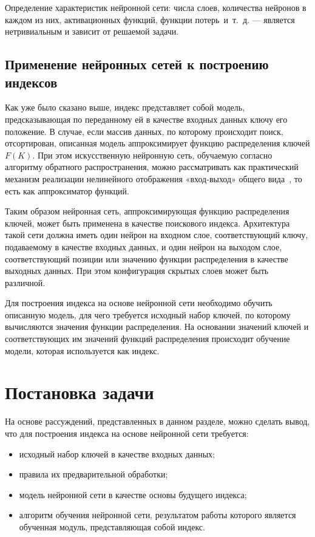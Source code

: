 Определение характеристик нейронной сети: числа слоев, количества нейронов в
каждом из них, активационных функций, функции потерь~и~т.~д. --- является
нетривиальным и зависит от решаемой задачи.

\subsection{Применение нейронных сетей к построению индексов}

Как уже было сказано выше, индекс представляет собой модель, предсказывающая по
переданному ей в качестве входных данных ключу его положение. В случае, если
массив данных, по которому происходит поиск, отсортирован, описанная модель
аппроксимирует функцию распределения ключей $F(K)$. При этом искусственную
нейронную сеть, обучаемую согласно алгоритму обратного распространения, можно
рассматривать как практический механизм реализации нелинейного отображения
«вход-выход» общего вида~\cite{kalistratov}, то есть как аппроксиматор функций.

Таким образом нейронная сеть, аппроксимирующая функцию распределения ключей,
может быть применена в качестве поискового индекса. Архитектура такой сети
должна иметь один нейрон на входном слое, соответствующий ключу, подаваемому в
качестве входных данных, и один нейрон на выходом слое, соответствующий позиции
или значению функции распределения в качестве выходных данных. При этом
конфигурация скрытых слоев может быть различной.


Для построения индекса на основе нейронной сети необходимо обучить описанную
модель, для чего требуется исходный набор ключей, по которому вычисляются
значения функции распределения. На основании значений ключей и соответствующих
им значений функций распределения происходит обучение модели, которая
используется как индекс.

\section{Постановка задачи}

На основе рассуждений, представленных в данном разделе, можно сделать вывод, что
для построения индекса на основе нейронной сети требуется:

\begin{itemize}
    \item исходный набор ключей в качестве входных данных;
    \item правила их предварительной обработки;
    \item модель нейронной сети в качестве основы будущего индекса;
    \item алгоритм обучения нейронной сети, результатом работы которого является
        обученная модуль, представляющая собой индекс.
\end{itemize}

